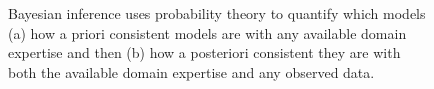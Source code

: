 \documentclass[
  letterpaper,
  DIV=11,
  numbers=noendperiod]{scrartcl}
\begin{document}
\begin{figure}

\begin{minipage}[t]{0.50\linewidth}

{\centering 


}

\subcaption{\label{fig-config_prior}}
\end{minipage}%
%
\begin{minipage}[t]{0.50\linewidth}

{\centering 


}

\subcaption{\label{fig-config-posterior}}
\end{minipage}%

\caption{\label{fig-bayesian-configs}Bayesian inference uses probability
theory to quantify which models (a) how a priori consistent models are
with any available domain expertise and then (b) how a posteriori
consistent they are with both the available domain expertise and any
observed data.}

\end{figure}
\end{document}
